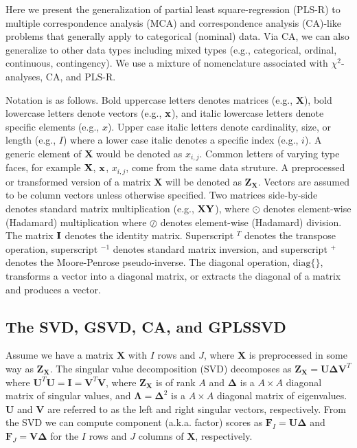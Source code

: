 \documentclass[12pt]{article}
\begin{document}
\label{section:PLSCAR}

Here we present the generalization of partial least square-regression
(PLS-R) to multiple correspondence analysis (MCA) and correspondence
analysis (CA)-like problems that generally apply to categorical
(nominal) data. Via CA, we can also generalize to other data types
including mixed types (e.g., categorical, ordinal, continuous,
contingency). We use a mixture of nomenclature associated with
\(\chi^2\)-analyses, CA, and PLS-R.

Notation is as follows. Bold uppercase letters denotes matrices (e.g.,
\(\mathbf{X}\)), bold lowercase letters denote vectors (e.g.,
\(\bf{x}\)), and italic lowercase letters denote specific elements
(e.g., \(x\)). Upper case italic letters denote cardinality, size, or
length (e.g., \(I\)) where a lower case italic denotes a specific index
(e.g., \(i\)). A generic element of \(\mathbf{X}\) would be denoted as
\(x_{i,j}\). Common letters of varying type faces, for example
\({\bf X}\), \(\bf{x}\), \(x_{i,j}\), come from the same data struture.
A preprocessed or transformed version of a matrix \({\mathbf X}\) will
be denoted as \({\mathbf Z}_{\mathbf X}\). Vectors are assumed to be
column vectors unless otherwise specified. Two matrices side-by-side
denotes standard matrix multiplication (e.g., \(\bf{X}\bf{Y}\)), where
\(\odot\) denotes element-wise (Hadamard) multiplication where
\(\oslash\) denotes element-wise (Hadamard) division. The matrix
\({\bf I}\) denotes the identity matrix. Superscript \(^{T}\) denotes
the transpose operation, superscript \(^{-1}\) denotes standard matrix
inversion, and superscript \(^{+}\) denotes the Moore-Penrose
pseudo-inverse. The diagonal operation, \(\mathrm{diag\{\}}\),
transforms a vector into a diagonal matrix, or extracts the diagonal of
a matrix and produces a vector.

\hypertarget{the-svd-gsvd-ca-and-gplssvd}{%
\subsection{The SVD, GSVD, CA, and
GPLSSVD}\label{the-svd-gsvd-ca-and-gplssvd}}

\label{section:GSVDCA}

Assume we have a matrix \({\mathbf X}\) with \(I\) rows and \(J\), where
\({\mathbf X}\) is preprocessed in some way as
\({\mathbf Z}_{\mathbf X}\). The singular value decomposition (SVD)
decomposes as
\({\mathbf Z}_{\mathbf X} = {\mathbf U} {\boldsymbol \Delta} {\mathbf V}^{T}\)
where
\({\mathbf U}^{T}{\mathbf U} = {\mathbf I} = {\mathbf V}^{T}{\mathbf V}\),
where \({\mathbf Z}_{\mathbf X}\) is of rank \(A\) and
\({\boldsymbol \Delta}\) is a \(A \times A\) diagonal matrix of singular
values, and \({\boldsymbol \Lambda} = {\boldsymbol \Delta}^2\) is a
\(A \times A\) diagonal matrix of eigenvalues. \({\mathbf U}\) and
\({\mathbf V}\) are referred to as the left and right singular vectors,
respectively. From the SVD we can compute component (a.k.a. factor)
scores as \({\mathbf F}_{I} = {\mathbf U}{\boldsymbol \Delta}\) and
\({\mathbf F}_{J} = {\mathbf V}{\boldsymbol \Delta}\) for the \(I\) rows
and \(J\) columns of \({\mathbf X}\), respectively.
\end{document}
